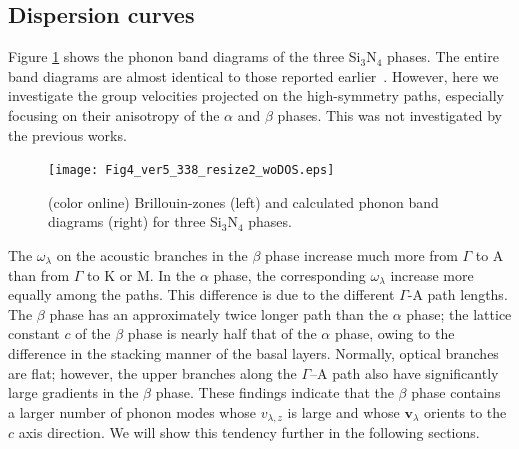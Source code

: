 \documentclass[twocolumn,amsmath,amssymb,a4paper,prb,superscriptaddress,floatfix]{revtex4-1}
\begin{document}
\subsection{Dispersion curves}

Figure \ref{fig:Fig4_ver5_338} shows the phonon band diagrams of the three
Si$_3$N$_4$ phases. The entire band diagrams are almost identical to those
reported earlier~\cite{kuwabara,xu}. However, here we investigate the group
velocities projected on the high-symmetry paths, especially focusing on their
anisotropy of the $\alpha$ and $\beta$ phases. This was
not investigated by the previous works.

\begin{figure}[ht]
 \begin{center}
  \texttt{[image: Fig4\_ver5\_338\_resize2\_woDOS.eps]}
  \caption{(color online) Brillouin-zones (left) and calculated phonon band diagrams (right) for three Si$_3$N$_4$ phases.
  \label{fig:Fig4_ver5_338} }
 \end{center}
\end{figure}

The $\omega_{\lambda}$ on the acoustic branches in the $\beta$ phase increase
much more from $\Gamma$ to A than from $\Gamma$ to K or M.  In the $\alpha$
phase, the corresponding $\omega_{\lambda}$ increase more equally among the
paths.  This difference is due to the different $\Gamma$-A path lengths.  The
$\beta$ phase has an approximately twice longer path than the $\alpha$ phase;
the lattice constant $c$ of the $\beta$ phase is nearly half that of the
$\alpha$ phase, owing to the difference in the stacking manner of the basal
layers. Normally, optical branches are flat; however, the upper branches along
the $\Gamma$--A path also have significantly large gradients in the $\beta$
phase.  These findings indicate that the $\beta$ phase contains a larger number
of phonon modes whose ${v}_{\lambda,z}$ is large and whose $\mathbf{v}_\lambda$
orients to the $c$ axis direction. We will show this tendency further in the
following sections.
\end{document}
